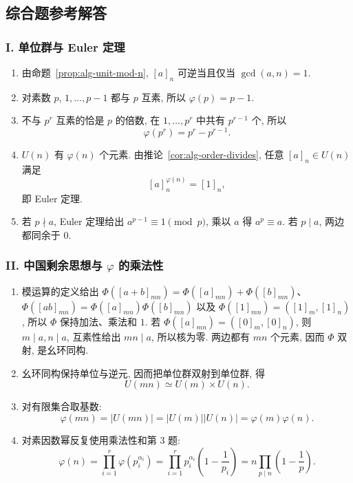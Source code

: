 \documentclass[usesamecnt, thmcnt=section, lang=cn, newtx, 10pt, scheme=chinese]{elegantbook}
\begin{document}
\subsection*{综合题参考解答}

\subsubsection*{I. 单位群与 Euler 定理}
\begin{enumerate}[label=\textbf{\arabic*.}]
  \item 由命题~\ref{prop:alg-unit-mod-n}, $[a]_n$ 可逆当且仅当 $\gcd(a,n)=1$.
  \item 对素数 $p$, $1,\ldots,p-1$ 都与 $p$ 互素, 所以 $\varphi(p)=p-1$.
  \item 不与 $p^r$ 互素的恰是 $p$ 的倍数, 在 $1,\ldots,p^r$ 中共有 $p^{r-1}$ 个, 所以
  \[
   \varphi(p^r)=p^r-p^{r-1}.
  \]
  \item $U(n)$ 有 $\varphi(n)$ 个元素. 由推论~\ref{cor:alg-order-divides}, 任意 $[a]_n\in U(n)$ 满足
  \[
   [a]_n^{\varphi(n)}=[1]_n,
  \]
  即 Euler 定理.
  \item 若 $p\nmid a$, Euler 定理给出 $a^{p-1}\equiv1\pmod p$, 乘以 $a$ 得 $a^p\equiv a$. 若 $p\mid a$, 两边都同余于 $0$.
\end{enumerate}

\subsubsection*{II. 中国剩余思想与 $\varphi$ 的乘法性}
\begin{enumerate}[label=\textbf{\arabic*.}, start=6]
  \item 模运算的定义给出 $\Phi([a+b]_{mn})=\Phi([a]_{mn})+\Phi([b]_{mn})$、$\Phi([ab]_{mn})=\Phi([a]_{mn})\Phi([b]_{mn})$ 以及 $\Phi([1]_{mn})=([1]_m,[1]_n)$, 所以 $\Phi$ 保持加法、乘法和 $1$. 若 $\Phi([a]_{mn})=([0]_m,[0]_n)$, 则 $m\mid a,n\mid a$, 互素性给出 $mn\mid a$, 所以核为零. 两边都有 $mn$ 个元素, 因而 $\Phi$ 双射, 是幺环同构.
  \item 幺环同构保持单位与逆元, 因而把单位群双射到单位群, 得
  \[
   U(mn)\simeq U(m)\times U(n).
  \]
  \item 对有限集合取基数:
  \[
   \varphi(mn)=|U(mn)|=|U(m)||U(n)|=\varphi(m)\varphi(n).
  \]
  \item 对素因数幂反复使用乘法性和第 3 题:
  \[
   \varphi(n)=\prod_{i=1}^r\varphi(p_i^{\alpha_i})
   =\prod_{i=1}^rp_i^{\alpha_i}\left(1-\frac1{p_i}\right)
   =n\prod_{p\mid n}\left(1-\frac1p\right).
  \]
\end{enumerate}
\end{document}
